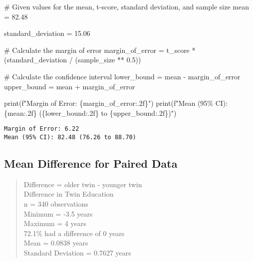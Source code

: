 \documentclass[
  letterpaper,
  DIV=11,
  numbers=noendperiod]{scrartcl}
\newenvironment{Shaded}{\begin{snugshade}}{\end{snugshade}}
\newcommand{\BuiltInTok}[1]{\textcolor[rgb]{0.00,0.23,0.31}{#1}}
\newcommand{\CommentTok}[1]{\textcolor[rgb]{0.37,0.37,0.37}{#1}}
\newcommand{\FloatTok}[1]{\textcolor[rgb]{0.68,0.00,0.00}{#1}}
\newcommand{\NormalTok}[1]{\textcolor[rgb]{0.00,0.23,0.31}{#1}}
\newcommand{\OperatorTok}[1]{\textcolor[rgb]{0.37,0.37,0.37}{#1}}
\newcommand{\SpecialCharTok}[1]{\textcolor[rgb]{0.37,0.37,0.37}{#1}}
\newcommand{\SpecialStringTok}[1]{\textcolor[rgb]{0.13,0.47,0.30}{#1}}
\begin{document}
\begin{Shaded}
\begin{Highlighting}[]
\CommentTok{\# Given values for the mean, t{-}score, standard deviation, and sample size}
\NormalTok{mean }\OperatorTok{=} \FloatTok{82.48}

\NormalTok{standard\_deviation }\OperatorTok{=} \FloatTok{15.06}


\CommentTok{\# Calculate the margin of error}
\NormalTok{margin\_of\_error }\OperatorTok{=}\NormalTok{ t\_score }\OperatorTok{*}\NormalTok{ (standard\_deviation }\OperatorTok{/}\NormalTok{ (sample\_size }\OperatorTok{**} \FloatTok{0.5}\NormalTok{))}

\CommentTok{\# Calculate the confidence interval}
\NormalTok{lower\_bound }\OperatorTok{=}\NormalTok{ mean }\OperatorTok{{-}}\NormalTok{ margin\_of\_error}
\NormalTok{upper\_bound }\OperatorTok{=}\NormalTok{ mean }\OperatorTok{+}\NormalTok{ margin\_of\_error}

\BuiltInTok{print}\NormalTok{(}\SpecialStringTok{f"Margin of Error: }\SpecialCharTok{\{}\NormalTok{margin\_of\_error}\SpecialCharTok{:.2f\}}\SpecialStringTok{"}\NormalTok{)}
\BuiltInTok{print}\NormalTok{(}\SpecialStringTok{f"Mean (95\% CI): }\SpecialCharTok{\{}\NormalTok{mean}\SpecialCharTok{:.2f\}}\SpecialStringTok{ (}\SpecialCharTok{\{}\NormalTok{lower\_bound}\SpecialCharTok{:.2f\}}\SpecialStringTok{ to }\SpecialCharTok{\{}\NormalTok{upper\_bound}\SpecialCharTok{:.2f\}}\SpecialStringTok{)"}\NormalTok{)}
\end{Highlighting}
\end{Shaded}

\begin{verbatim}
Margin of Error: 6.22
Mean (95% CI): 82.48 (76.26 to 88.70)
\end{verbatim}

\hypertarget{mean-difference-for-paired-data}{%
\subsection{Mean Difference for Paired
Data}\label{mean-difference-for-paired-data}}

\begin{quote}
Difference = older twin - younger twin\\
Difference in Twin Education\\
n = 340 observations\\
Minimum = -3.5 years\\
Maximum = 4 years\\
72.1\% had a difference of 0 years\\
Mean = 0.0838 years\\
Standard Deviation = 0.7627 years
\end{quote}
\end{document}
